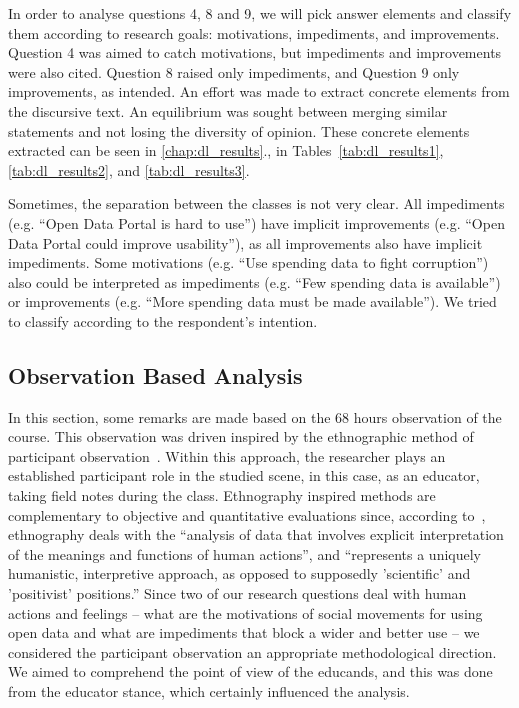 In order to analyse questions 4, 8 and 9, we will pick answer elements and classify them according to research 
goals: motivations, impediments, and improvements. Question 4 was aimed to catch motivations, but impediments and improvements were also cited. Question 8 raised only impediments, and Question 9 only improvements, as intended.
An effort was made to extract concrete elements from the discursive text. An equilibrium was sought between merging similar statements and not losing the diversity of opinion. These concrete elements extracted can be seen in \autoref{chap:dl_results}., in Tables~\ref{tab:dl_results1}, \ref{tab:dl_results2}, and \ref{tab:dl_results3}.

Sometimes, the separation between the classes is not very clear. All impediments (e.g. “Open Data Portal is hard to use”) have implicit improvements (e.g. “Open Data Portal could improve usability”), as all improvements also have implicit impediments. Some motivations (e.g. “Use spending data to fight corruption”) also could be interpreted as impediments (e.g. “Few spending data is available”) or improvements (e.g. “More spending data must be made available”). We tried to classify according to the respondent's intention.

\subsection{Observation Based Analysis}
\label{sec:obs_based_analysis}
In this section, some remarks are made based on the 68 hours observation of the course. This observation was driven inspired by the ethnographic method of participant observation~\cite{Atkinson1994}. Within this approach, the researcher plays an established participant role in the studied scene, in this case, as an educator, taking field notes during the class. Ethnography inspired methods are complementary to objective and quantitative evaluations since, according to~, ethnography deals with the “analysis of data that involves explicit interpretation of the meanings and functions of human actions”, and “represents a uniquely humanistic, interpretive approach, as opposed to supposedly 'scientific' and 'positivist' positions.” Since two of our research questions deal with human actions and feelings – what are the motivations of social movements for using open data and what are impediments that block a wider and better use – we considered the participant observation an appropriate methodological direction. We aimed to comprehend the point of view of the educands, and this was done from the educator stance, which certainly influenced the analysis.

